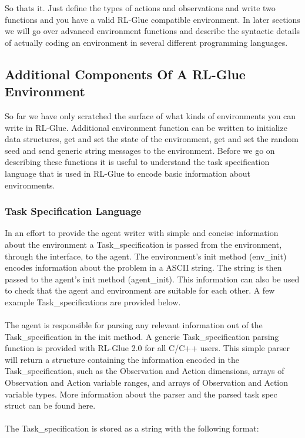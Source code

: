 \documentclass[11pt]{article}
\begin{document}
So thats it. Just define the types of actions and observations and write two functions and you have a valid RL-Glue compatible environment. In later sections we will go over advanced environment functions and describe the syntactic details of actually coding an environment in several different programming languages. 

\subsection{Additional Components Of A RL-Glue Environment}
\label{envp2}

So far we have only scratched the surface of what kinds of environments you can write in RL-Glue. Additional environment function can be written to initialize data structures, get and set the state of the environment, get and set the random seed and send generic string messages to the environment. Before we go on describing these functions it is useful to understand the task specification language that is used in RL-Glue to encode basic information about environments. 

\subsubsection{Task Specification Language}
In an effort to provide the agent writer with simple and concise information about the environment a Task\_specification is passed from the environment, through the interface, to the agent. The environment's init method (env\_init) encodes information about the problem in a ASCII string. The string is then passed to the agent's init method (agent\_init).  This information can also be used to check that the agent and environment are suitable for each other. A few example Task\_specifications are provided below.
\\\\
The agent is responsible for parsing any relevant information out of the Task\_specification in the init method. A generic Task\_specification parsing function is provided with RL-Glue 2.0 for all C/C++ users. This simple parser will return a structure containing the information encoded in the Task\_specification, such as the Observation and Action dimensions, arrays of Observation and Action variable ranges, and arrays of Observation and Action variable types. More information about the parser and the parsed task spec struct can be found here.
\\\\
The Task\_specification is stored as a string with the following format:
\end{document}
